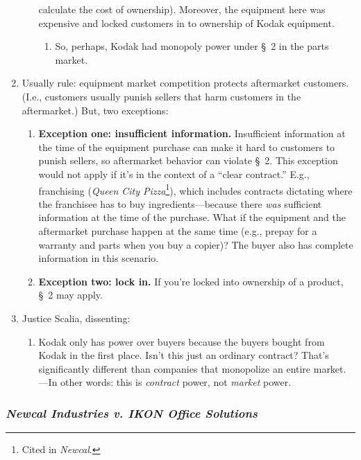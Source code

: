 \begin{enumerate}
\begin{enumerate}
        calculate the cost of ownership). Moreover, the equipment here was 
        expensive and locked customers in to ownership of Kodak equipment.
        \begin{enumerate}
            \item So, perhaps, Kodak had monopoly power under \S\ 2 in 
            the parts market.
        \end{enumerate}
    \end{enumerate}
    \item Usually rule: equipment market competition protects aftermarket 
    customers. (I.e., customers usually punish sellers that harm customers in 
    the aftermarket.) But, two exceptions: 
    \begin{enumerate}
        \item \textbf{Exception one: insufficient information.} Insufficient 
        information at the time of the equipment purchase can make it hard to 
        customers to punish sellers, so aftermarket behavior can violate \S\ 
        2. This exception would not apply if it's in the context of a ``clear 
        contract.'' E.g., franchising (\emph{Queen City Pizza}\footnote{Cited 
        in \emph{Newcal}.}), which includes contracts dictating where the 
        franchisee has to buy ingredients---because there \emph{was} 
        sufficient information at the time of the purchase. What if the 
        equipment and the aftermarket purchase happen at the same time (e.g., 
        prepay for a warranty and parts when you buy a copier)? The buyer also 
        has complete information in this scenario.
        \item \textbf{Exception two: lock in.} If you're locked into ownership 
        of a product, \S\ 2 may apply.
    \end{enumerate}
    \item Justice Scalia, dissenting:
    \begin{enumerate}
        \item Kodak only has power over buyers because the buyers bought from 
        Kodak in the first place. Isn't this just an ordinary contract? That's 
        significantly different than companies that monopolize an entire 
        market.---In other words: this is \emph{contract} power, not 
        \emph{market} power.
    \end{enumerate}
\end{enumerate}

\subsubsection{\emph{Newcal Industries v. IKON Office Solutions}}

